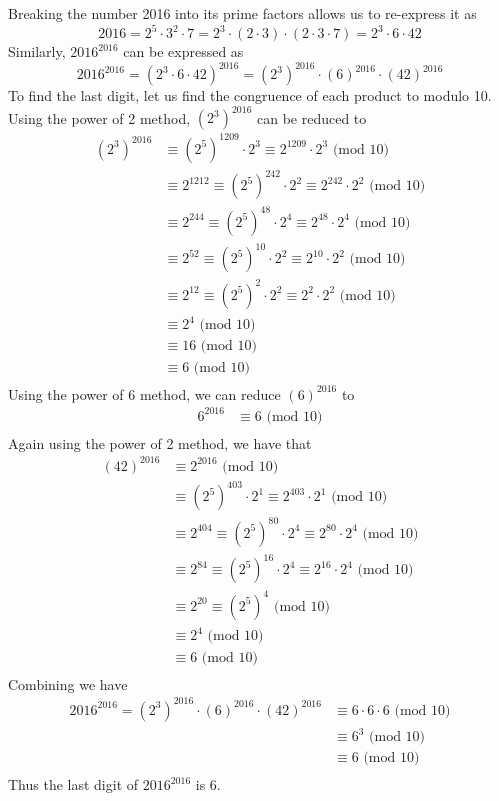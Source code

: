 \documentclass[11pt, oneside]{article}   	%
\begin{document}
Breaking the number 2016 into its prime factors allows us to re-express it as
$$2016 = 2^5 \cdot 3^2 \cdot 7 = 2^3 \cdot (2 \cdot 3) \cdot (2 \cdot 3 \cdot 7) = 2^3 \cdot 6 \cdot 42$$
Similarly, $2016^{2016}$ can be expressed as 
$$2016^{2016} = (2^3 \cdot 6 \cdot 42)^{2016} = (2^3)^{2016} \cdot (6)^{2016} \cdot (42)^{2016}$$
To find the last digit, let us find the congruence of each product to modulo 10. Using the power of 2 method, $(2^3)^{2016}$ can be reduced to 
\begin{align*}
	(2^3)^{2016} & \equiv (2^5)^{1209} \cdot 2^3 \equiv 2^{1209} \cdot 2^3 \text{ (mod 10)}\\
	& \equiv 2^{1212} \equiv (2^5)^{242} \cdot 2^2 \equiv 2^{242} \cdot 2^2 \text{ (mod 10)}\\
	& \equiv 2^{244} \equiv (2^5)^{48} \cdot 2^4 \equiv 2^{48} \cdot 2^4 \text{ (mod 10)}\\
	& \equiv 2^{52} \equiv (2^5)^{10} \cdot 2^2 \equiv 2^{10} \cdot 2^2 \text{ (mod 10)}\\
	& \equiv 2^{12} \equiv (2^5)^2 \cdot 2^2 \equiv 2^2 \cdot 2^2 \text{ (mod 10)}\\
	& \equiv 2^4 \text{ (mod 10)}\\
	& \equiv 16 \text{ (mod 10)}\\
	& \equiv 6 \text{ (mod 10)}\\
\end{align*}
Using the power of 6 method, we can reduce $(6)^{2016}$ to
\begin{align*}
	6^{2016} & \equiv 6 \text{ (mod 10)}\\
\end{align*}
Again using the power of 2 method, we have that 
\begin{align*}
	(42)^{2016} & \equiv 2^{2016} \text{ (mod 10)}\\
	& \equiv (2^5)^{403} \cdot 2^1 \equiv 2^{403} \cdot 2^1 \text{ (mod 10)}\\
	& \equiv 2^{404} \equiv (2^5)^{80} \cdot 2^4 \equiv 2^{80} \cdot 2^4 \text{ (mod 10)}\\
	& \equiv 2^{84} \equiv (2^5)^{16} \cdot 2^4 \equiv 2^{16} \cdot 2^4 \text{ (mod 10)}\\
	& \equiv 2^{20} \equiv (2^5)^4 \text{ (mod 10)}\\
	& \equiv 2^4 \text{ (mod 10)}\\
	& \equiv 6 \text{ (mod 10)}\\
\end{align*}
Combining we have
\begin{align*}
	2016^{2016} = (2^3)^{2016} \cdot (6)^{2016} \cdot (42)^{2016} & \equiv 6 \cdot 6 \cdot 6 \text{ (mod 10)} \\
	& \equiv 6^3 \text{ (mod 10)} \\
	& \equiv 6 \text{ (mod 10)} \\
\end{align*}
Thus the last digit of $2016^{2016}$ is 6.
\end{document}
